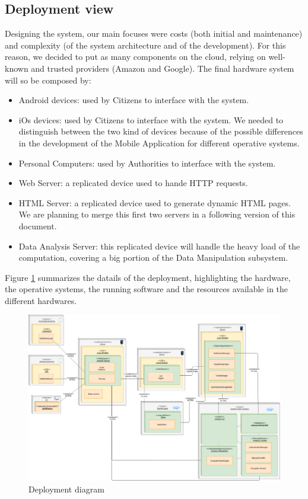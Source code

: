 \documentclass{article}
\begin{document}
	\subsection{Deployment view} 
	Designing the system, our main focuses were costs (both initial and maintenance) and complexity (of the system architecture and of the development).
	For this reason, we decided to put as many components on the cloud, relying on well-known and trusted providers (Amazon and Google). The final hardware system will so be composed by:
	\begin{itemize}
		\item Android devices: used by Citizens to interface with the system.
		\item iOs devices: used by Citizens to interface with the system. We needed to distinguish between the two kind of devices because of the possible differences in the development of the Mobile Application for different operative systems.
		\item Personal Computers: used by Authorities to interface with the system.
		\item Web Server: a replicated device used to hande HTTP requests.
		\item HTML Server: a replicated device used to generate dynamic HTML pages. We are planning to merge this first two servers in a following version of this document.
		\item Data Analysis Server: this replicated device will handle the heavy load of the computation, covering a big portion of the Data Manipulation subsystem.
	\end{itemize}
	Figure \ref{fig:Deployment} summarizes the datails of the deployment, highlighting the hardware, the operative systems, the running software and the resources available in the different hardwares.
	\begin{figure}[h]
		\includegraphics[width=\linewidth]{images/Deployment_diagram.png}
		\caption{Deployment diagram}
		\label{fig:Deployment}
	\end{figure}
	\newpage \FloatBarrier
\end{document}
